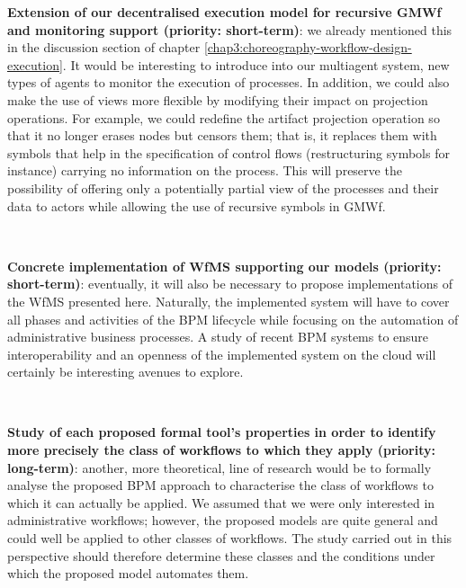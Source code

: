 \noindent\textbf{Extension of our decentralised execution model for recursive GMWf and monitoring support (priority: short-term)}: we already mentioned this in the discussion section of chapter \ref{chap3:choreography-workflow-design-execution}. It would be interesting to introduce into our multiagent system, new types of agents to monitor the execution of processes. In addition, we could also make the use of views more flexible by modifying their impact on projection operations. For example, we could redefine the artifact projection operation so that it no longer erases nodes but censors them; that is, it replaces them with symbols that help in the specification of control flows (restructuring symbols for instance) carrying no information on the process. This will preserve the possibility of offering only a potentially partial view of the processes and their data to actors while allowing the use of recursive symbols in GMWf.



~

\noindent\textbf{Concrete implementation of WfMS supporting our models (priority: short-term)}: eventually, it will also be necessary to propose implementations of the WfMS presented here. Naturally, the implemented system will have to cover all phases and activities of the BPM lifecycle while focusing on the automation of administrative business processes. A study of recent BPM systems to ensure interoperability and an openness of the implemented system on the cloud will certainly be interesting avenues to explore.



~

\noindent\textbf{Study of each proposed formal tool's properties in order to identify more precisely the class of workflows to which they apply (priority: long-term)}: another, more theoretical, line of research would be to formally analyse the proposed BPM approach to characterise the class of workflows to which it can actually be applied. We assumed that we were only interested in administrative workflows; however, the proposed models are quite general and could well be applied to other classes of workflows. The study carried out in this perspective should therefore determine these classes and the conditions under which the proposed model automates them.



\myCleanStarChapterEnd

